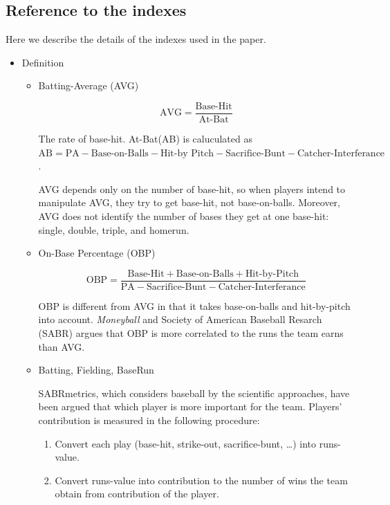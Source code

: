 \documentclass[dvipdfmx, 12pt]{article}
\begin{document}
\subsection{Reference to the indexes}
\small

Here we describe the details of the indexes used in the paper.

\begin{itemize}
  \item Definition

  \begin{itemize}
    \item Batting-Average (AVG)

    \[
    \text{AVG} = \dfrac{\text{Base-Hit}}{\text{At-Bat}}
    \]

    The rate of base-hit. At-Bat(AB) is caluculated as $\text{AB} = \text{PA} - \text{Base-on-Balls} - \text{Hit-by Pitch} - \text{Sacrifice-Bunt} - \text{Catcher-Interferance}$.

    AVG depends only on the number of base-hit, so when players intend to manipulate AVG, they try to get base-hit, not base-on-balls. Moreover, AVG does not identify the number of bases they get at one base-hit: single, double, triple, and homerun.

    \item On-Base Percentage (OBP)

    \[
    \text{OBP} = \dfrac{\text{Base-Hit} + \text{Base-on-Balls} + \text{Hit-by-Pitch}}{\text{PA} - \text{Sacrifice-Bunt} - \text{Catcher-Interferance}}
    \]

    OBP is different from AVG in that it takes base-on-balls and hit-by-pitch into account. \textit{Moneyball} and Society of American Baseball Resarch (SABR) argues that OBP is more correlated to the runs the team earns than AVG.

    \item Batting, Fielding, BaseRun

    SABRmetrics, which considers baseball by the scientific approaches, have been argued that which player is more important for the team. Players' contribution is measured in the following procedure:

    \begin{enumerate}
      \item Convert each play (base-hit, strike-out, sacrifice-bunt, \ldots) into runs-value.

      \item Convert runs-value into contribution to the number of wins the team obtain from contribution of the player.
    \end{enumerate}


\end{itemize}
\end{itemize}
\end{document}
